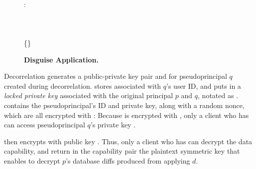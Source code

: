 \begin{figure*}[t!]
{\pcforeach {} \in {}\\
\quad \pcif {}: \\
\quad\quad {} \gets {}\\
\quad\quad {}\\
\pcendforeach\pclb
{}
\<  \< \\
\<\< \{\addr{}\}\gets{} \pclb
{}
}
\caption{\textbf{Disguise Application.}}
\label{fig:disgapp}
\end{figure*} 
\fi

\iffalse
{}
Decorrelation generates a public-private key pair  and  for pseudoprincipal $q$
created during decorrelation.
\sys stores  associated with $q$'s user ID, and puts  in a \emph{locked private key}
associated with the original principal $p$ and $q$, notated as .  contains the
pseudoprincipal's ID and private key, along with a random nonce, which are all encrypted with :
Because  is encrypted with , only a client who has
 can access pseudoprincipal $q$'s private key .


\sys then encrypts  with public key .  
%
Thus, only a client who has  can decrypt the data capability, and return in the capability pair the plaintext symmetric key that enables \sys to decrypt $p$'s database diffs produced from applying $d$.

